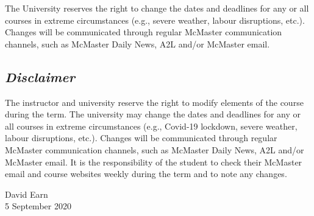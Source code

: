 \documentclass[12pt]{article}
\begin{document}
The University reserves the right to change the dates and deadlines
for any or all courses in extreme circumstances (e.g., severe weather,
labour disruptions, etc.). Changes will be communicated through
regular McMaster communication channels, such as McMaster Daily News,
A2L and/or McMaster email.

\subsection*{\slshape Disclaimer}
The instructor and university reserve the right to modify elements of the course during the term. The university may change the dates and deadlines for any or all courses in extreme circumstances (e.g., Covid-19 lockdown, severe weather, labour disruptions, etc.). Changes will be communicated through regular McMaster communication channels, such as McMaster Daily News, A2L and/or McMaster email. It is the responsibility of the student to check their McMaster email and course websites weekly during the term and to note any changes.

\bigskip \bigskip
\noindent
David Earn\\
5 September 2020
\end{document}
